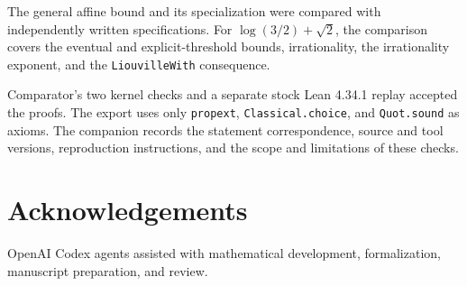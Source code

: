 \documentclass[11pt]{article}
\theoremstyle{remark}
\begin{document}
The general affine bound and its specialization were compared with
independently written specifications. For $\log(3/2)+\sqrt2$, the
comparison covers the eventual and explicit-threshold bounds, irrationality,
the irrationality exponent, and the \texttt{LiouvilleWith} consequence.

Comparator's two kernel checks and a separate stock Lean 4.34.1 replay
accepted the proofs. The export uses only \texttt{propext},
\texttt{Classical.choice}, and \texttt{Quot.sound} as axioms.
The companion  records the statement correspondence,
source and tool versions, reproduction instructions, and the scope
and limitations of these checks.

\section*{Acknowledgements}
OpenAI Codex agents assisted with mathematical development, formalization,
manuscript preparation, and review.
\end{document}
